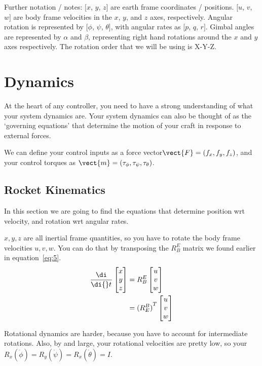 \documentclass{report}
\newcommand{\diff}[1]{\frac{\di}{\di{}t_{#1}}}
\newcommand{\cvec}[1]{\begin{bmatrix}
    #1
\end{bmatrix}}
\begin{document}
Further notation / notes: $[x$, $y$, $z]$ are earth frame coordinates / positions. $[u$, $v$, $w]$ are body frame velocities in the $x$, $y$, and $z$ axes, respectively. Angular rotation is represented by $[\phi$, $\psi$, $\theta]$, with angular rates as $[p$, $q$, $r]$. Gimbal angles are represented by $\alpha$ and $\beta$, representing right hand rotations around the $x$ and $y$ axes respectively. The rotation order that we will be using is X{-}Y{-}Z. 

\section{Dynamics}

At the heart of any controller, you need to have a strong understanding of what your system dynamics are. Your system dynamics can also be thought of as the `governing equations' that determine the motion of your craft in response to external forces. 

We can define your control inputs as a force vector$\vect{F} = (f_x, f_y, f_z)$, and your control torques as $\vect{m} = (\tau_{\phi}, \tau_{\psi}, \tau_{\theta})$.

\subsection{Rocket Kinematics}
In this section we are going to find the equations that determine position wrt velocity, and rotation wrt angular rates.

$x, y, z$ are all inertial frame quantities, so you have to rotate the body frame velocities $u, v, w$. You can do that by transposing the $R^E_B$ matrix we found earlier in equation{~}\ref{eq:5}. 
\begin{equation}
    \begin{split}
        \diff{}\cvec{x\\y\\z}
        &= R^E_B \cvec{u\\v\\w}\\ 
        &={( R^B_E )}^T \cvec{u\\v\\w}
    \end{split}
\end{equation}

Rotational dynamics are harder, because you have to account for intermediate rotations. Also, by and large, your rotational velocities are pretty low, so your $R_x(\dot \phi)=R_y(\dot \psi)=R_x(\dot \theta) = I$.
\end{document}
